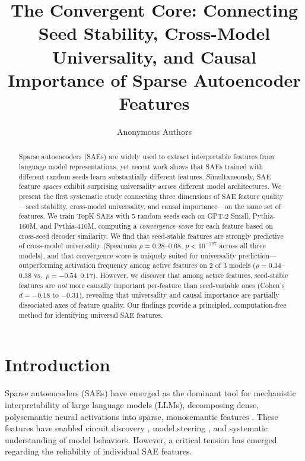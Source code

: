 \documentclass[final]{article}
\title{The Convergent Core: Connecting Seed Stability, Cross-Model Universality, and Causal Importance of Sparse Autoencoder Features}
\author{
  Anonymous Authors
}
\begin{document}
\maketitle

\begin{abstract}
Sparse autoencoders (SAEs) are widely used to extract interpretable features from language model representations, yet recent work shows that SAEs trained with different random seeds learn substantially different features. Simultaneously, SAE feature \emph{spaces} exhibit surprising universality across different model architectures. We present the first systematic study connecting three dimensions of SAE feature quality---seed stability, cross-model universality, and causal importance---on the same set of features. We train TopK SAEs with 5 random seeds each on GPT-2 Small, Pythia-160M, and Pythia-410M, computing a \emph{convergence score} for each feature based on cross-seed decoder similarity. We find that seed-stable features are strongly predictive of cross-model universality (Spearman $\rho = 0.28$--$0.68$, $p < 10^{-297}$ across all three models), and that convergence score is uniquely suited for universality prediction---outperforming activation frequency among active features on 2 of 3 models ($\rho = 0.34$--$0.38$ vs.\ $\rho = -0.54$--$0.17$). However, we discover that among active features, seed-stable features are \emph{not} more causally important per-feature than seed-variable ones (Cohen's $d = -0.18$ to $-0.31$), revealing that universality and causal importance are partially dissociated axes of feature quality. Our findings provide a principled, computation-free method for identifying universal SAE features.
\end{abstract}

\section{Introduction}

Sparse autoencoders (SAEs) have emerged as the dominant tool for mechanistic interpretability of large language models (LLMs), decomposing dense, polysemantic neural activations into sparse, monosemantic features \citep{cunningham2023sparse, bricken2023monosemanticity}. These features have enabled circuit discovery \citep{marks2025sparse}, model steering \citep{templeton2024scaling}, and systematic understanding of model behaviors. However, a critical tension has emerged regarding the reliability of individual SAE features.
\end{document}
